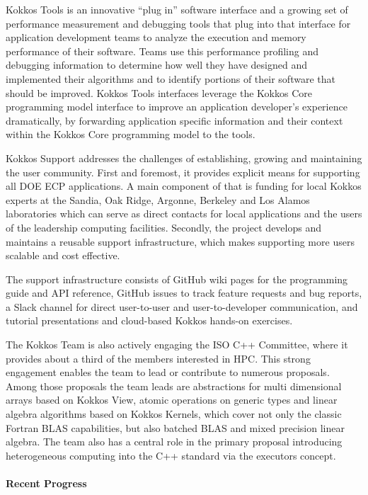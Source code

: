 Kokkos Tools is an innovative “plug in” software interface and a growing set of performance measurement and debugging tools that plug into that interface for application development teams to analyze the execution and memory performance of their software. Teams use this performance profiling and debugging information to determine how well they have designed and implemented their algorithms and to identify portions of their software that should be improved. Kokkos Tools interfaces  leverage the Kokkos Core programming model interface to improve an application developer’s experience dramatically, by forwarding application specific information and their context within the Kokkos Core programming model to the tools.

Kokkos Support addresses the challenges of establishing, growing and maintaining the user community.
First and foremost, it provides explicit means for supporting all DOE ECP applications. 
A main component of that is funding for local Kokkos experts at the Sandia, Oak Ridge, Argonne, Berkeley and Los Alamos laboratories which can serve as direct contacts for local applications and the users of the leadership computing facilities. 
Secondly, the project develops and maintains a reusable support infrastructure, which makes supporting more users scalable and cost effective. 

The support infrastructure consists of GitHub wiki pages for the programming guide and API reference, GitHub issues to track feature requests and bug reports, a Slack channel for direct user-to-user and user-to-developer communication, and tutorial presentations and cloud-based Kokkos hands-on exercises. 

The Kokkos Team is also actively engaging the ISO C++ Committee, where it provides about a third of the members interested in HPC.
This strong engagement enables the team to lead or contribute to numerous proposals.
Among those proposals the team leads are abstractions for multi dimensional arrays based on Kokkos View, atomic operations on generic types and linear algebra algorithms based on Kokkos Kernels, which cover not only the classic Fortran BLAS capabilities, but also batched BLAS and mixed precision linear algebra.
The team also has a central role in the primary proposal introducing heterogeneous computing into the C++ standard via the executors concept.

\paragraph{Recent Progress}

